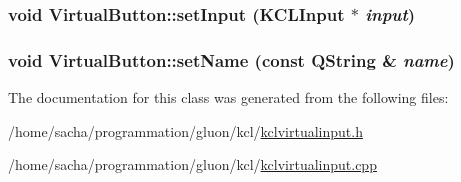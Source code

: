 \hypertarget{class_virtual_button_08f64dcc90e220b3ff9720f2cdf29072}{
\subsubsection[{setInput}]{\setlength{\rightskip}{0pt plus 5cm}void VirtualButton::setInput ({\bf KCLInput} $\ast$ {\em input})}}
\label{class_virtual_button_08f64dcc90e220b3ff9720f2cdf29072}


\hypertarget{class_virtual_button_f66cc874223da73e9e68f05f4470a2a1}{
\subsubsection[{setName}]{\setlength{\rightskip}{0pt plus 5cm}void VirtualButton::setName (const QString \& {\em name})}}
\label{class_virtual_button_f66cc874223da73e9e68f05f4470a2a1}




The documentation for this class was generated from the following files:\begin{CompactItemize}
\item 
/home/sacha/programmation/gluon/kcl/\hyperlink{kclvirtualinput_8h}{kclvirtualinput.h}\item 
/home/sacha/programmation/gluon/kcl/\hyperlink{kclvirtualinput_8cpp}{kclvirtualinput.cpp}\end{CompactItemize}
